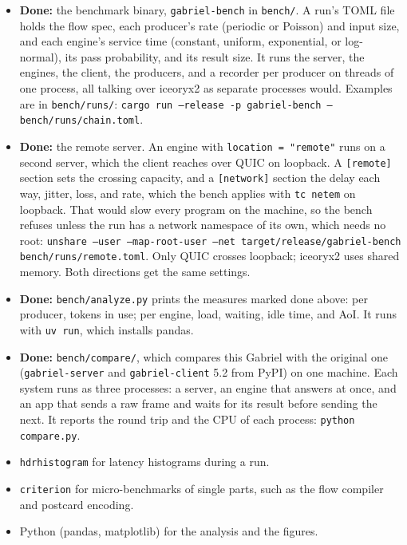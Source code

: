 \documentclass[11pt]{article}
\newcommand{\code}[1]{\texttt{#1}}
\begin{document}
\begin{itemize}[nosep]
  \item \textbf{Done:} the benchmark binary, \code{gabriel-bench} in
        \code{bench/}. A run's TOML file holds the flow spec, each producer's
        rate (periodic or Poisson) and input size, and each engine's service
        time (constant, uniform, exponential, or log-normal), its pass
        probability, and its result size. It runs the server, the engines,
        the client, the producers, and a recorder per producer on threads of
        one process, all talking over iceoryx2 as separate processes would.
        Examples are in \code{bench/runs/}:
        \code{cargo run --release -p gabriel-bench -- bench/runs/chain.toml}.
  \item \textbf{Done:} the remote server. An engine with
        \code{location = "remote"} runs on a second server, which the client
        reaches over QUIC on loopback. A \code{[remote]} section sets the
        crossing capacity, and a \code{[network]} section the delay each way,
        jitter, loss, and rate, which the bench applies with \code{tc netem}
        on loopback. That would slow every program on the machine, so the
        bench refuses unless the run has a network namespace of its own,
        which needs no root:
        \code{unshare --user --map-root-user --net target/release/gabriel-bench
        bench/runs/remote.toml}. Only QUIC crosses loopback; iceoryx2 uses
        shared memory. Both directions get the same settings.
  \item \textbf{Done:} \code{bench/analyze.py} prints the measures marked
        done above: per producer, tokens in use; per engine, load, waiting,
        idle time, and AoI. It runs with \code{uv run}, which installs
        pandas.
  \item \textbf{Done:} \code{bench/compare/}, which compares this Gabriel
        with the original one (\code{gabriel-server} and
        \code{gabriel-client} 5.2 from PyPI) on one machine. Each system runs
        as three processes: a server, an engine that answers at once, and an
        app that sends a raw frame and waits for its result before sending
        the next. It reports the round trip and the CPU of each process:
        \code{python compare.py}.
  \item \code{hdrhistogram} for latency histograms during a run.
  \item \code{criterion} for micro-benchmarks of single parts, such as the
        flow compiler and postcard encoding.
  \item Python (pandas, matplotlib) for the analysis and the figures.
\end{itemize}
\end{document}
